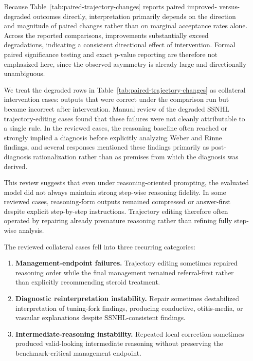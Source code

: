 \documentclass[twocolumn]{article}
\begin{document}
Because Table~\ref{tab:paired-trajectory-changes} reports paired improved-
versus-degraded outcomes directly, interpretation primarily depends on the
direction and magnitude of paired changes rather than on marginal acceptance
rates alone. Across the reported comparisons, improvements substantially
exceed degradations, indicating a consistent directional effect of
intervention. Formal paired significance testing and exact p-value reporting
are therefore not emphasized here, since the observed asymmetry is already
large and directionally unambiguous.

We treat the degraded rows in
Table~\ref{tab:paired-trajectory-changes} as collateral intervention cases:
outputs that were correct under the comparison run but became incorrect after
intervention. Manual review of the
\SSNHLTrajectoryDegradedCount{} degraded SSNHL trajectory-editing cases found
that these failures were not cleanly attributable to a single rule. In the
reviewed cases, the reasoning baseline often reached or strongly implied a
diagnosis before explicitly analyzing Weber and Rinne findings, and several
responses mentioned these findings primarily as post-diagnosis rationalization
rather than as premises from which the diagnosis was derived.

This review suggests that even under reasoning-oriented prompting, the
evaluated model did not always maintain strong step-wise reasoning fidelity. In
some reviewed cases, reasoning-form outputs remained compressed or
answer-first despite explicit step-by-step instructions. Trajectory editing
therefore often operated by repairing already premature reasoning rather than
refining fully step-wise analysis.

The reviewed collateral cases fell into three recurring categories:

\begin{enumerate}[leftmargin=*,nosep]
\item \textbf{Management-endpoint failures.}
Trajectory editing sometimes repaired reasoning order while the final
management remained referral-first rather than explicitly recommending steroid
treatment.

\item \textbf{Diagnostic reinterpretation instability.}
Repair sometimes destabilized interpretation of tuning-fork findings,
producing conductive, otitis-media, or vascular explanations despite
SSNHL-consistent findings.

\item \textbf{Intermediate-reasoning instability.}
Repeated local correction sometimes produced valid-looking intermediate
reasoning without preserving the benchmark-critical management endpoint.
\end{enumerate}
\end{document}

